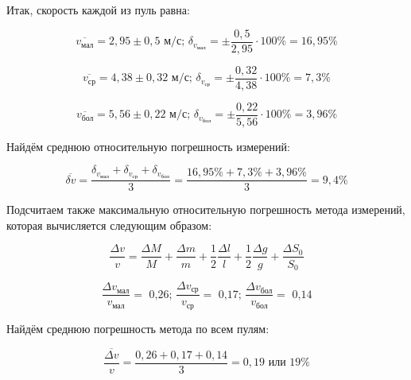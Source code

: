 Итак, скорость каждой из пуль равна:

\begin{equation*} 
        \overline{v_\text{мал}} = 2,95 \pm 0,5 \text{ м/с; }
        \delta_{v_\text{мал}} = \pm \frac{0,5}{2,95} \cdot 100 \% = 16,95 \%
\end{equation*}

\begin{equation*} 
        \overline{v_\text{ср}} = 4,38 \pm 0,32 \text{ м/с; }
        \delta_{v_\text{ср}} = \pm\frac{0,32}{4,38}\cdot 100 \% = 7,3 \%
\end{equation*}

\begin{equation*} 
        \overline{v_\text{бол}} = 5,56 \pm 0,22 \text{ м/с; }
        \delta_{v_\text{бол}} =\pm\frac{0,22}{5,56}\cdot 100 \% = 3,96 \%
\end{equation*}

Найдём среднюю относительную погрешность измерений:

\begin{equation*}
				\overline{\delta v} = \frac{\delta_{v_\text{мал}} + \delta_{v_\text{ср}} + \delta_{v_\text{бол}}}{3} = 
				\frac{16,95 \% + 7,3 \% + 3,96 \%}{3} = 9,4 \%
\end{equation*}

Подсчитаем также максимальную относительную погрешность метода измерений, которая вычисляется следующим образом:

\begin{equation*}
        \frac{\Delta v}{v}=\frac{\Delta M}{M}+\frac{\Delta m}{m}+\frac{1}{2}\frac{\Delta l}{l}+\frac{1}{2}\frac{\Delta g}{g}+\frac{\Delta S_0}{S_0}
\end{equation*}

\begin{equation*} 
        \frac{\Delta v_\text{мал}}{v_\text{мал}} = \text{ 0,26; }
        \frac{\Delta v_\text{ср}}{v_\text{ср}} = \text{ 0,17; }
        \frac{\Delta v_\text{бол}}{v_\text{бол}} = \text{ 0,14}
\end{equation*} 

Найдём среднюю погрешность метода по всем пулям:

\begin{equation*}
        \overline{\frac{\Delta v}{v}} = \frac{0,26 + 0,17 + 0,14}{3} = 0,19 \text{ или 19\%}
\end{equation*}
